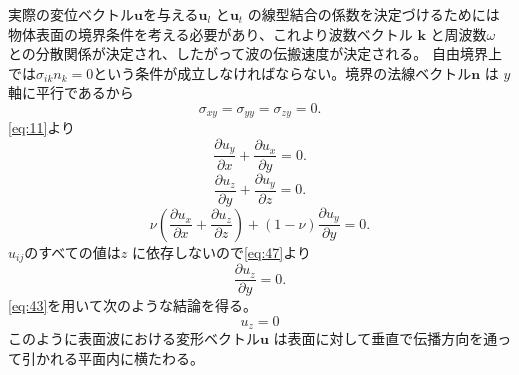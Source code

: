 \documentclass[dvipdfmx,11pt]{jsreport}
\numberwithin{equation}{chapter}
\numberwithin{table}{chapter}
\begin{document}
実際の変位ベクトル$\bm{u}$を与える$\bm{u}_l$ と$\bm{u}_t$ の線型結合の係数を決定づけるためには物体表面の境界条件を考える必要があり、これより波数ベクトル
$\bm{k}$ と周波数$\omega$ との分散関係が決定され、したがって波の伝搬速度が決定される。
自由境界上では$\sigma_{ik}n_k=0$という条件が成立しなければならない。境界の法線ベクトル$\bm{n}$ は
$y$ 軸に平行であるから
\begin{equation}
\label{eq:45}
	\sigma_{xy}=\sigma_{yy}=\sigma_{zy}=0
.\end{equation}
\eqref{eq:11}より
\begin{equation}
\label{eq:46}
	\frac{\partial u_y}{\partial x} +\frac{\partial u_x}{\partial y} =0
.\end{equation}
\begin{equation}
\label{eq:47}
	\frac{\partial u_z}{\partial y} +\frac{\partial u_y}{\partial z} =0
.\end{equation}
\begin{equation}
\label{eq:48}
	\nu (\frac{\partial u_x}{\partial x} +\frac{\partial u_z}{\partial z} )+(1-\nu)\frac{\partial u_y}{\partial y}=0 
.\end{equation}
$u_{ij}$のすべての値は$z$ に依存しないので\eqref{eq:47}より
\begin{equation}
\label{eq:49}
	\frac{\partial u_z}{\partial y} =0
.\end{equation}
\eqref{eq:43}を用いて次のような結論を得る。
\begin{equation}
\label{eq:50}
	u_{z}=0
\end{equation}
このように表面波における変形ベクトル$\bm{u}$ は表面に対して垂直で伝播方向を通って引かれる平面内に横たわる。
\end{document}
